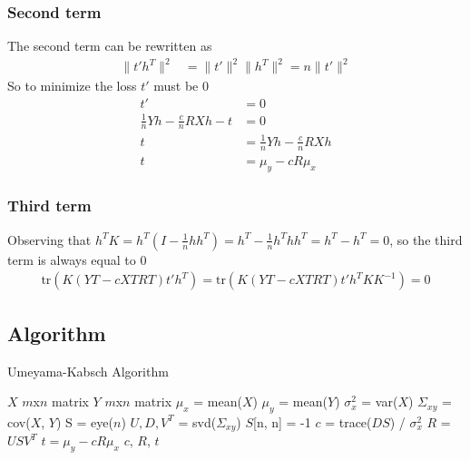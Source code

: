 \documentclass{report}
\begin{document}
\subsubsection{Second term}
The second term can be rewritten as
\begin{align}
    \lVert t'h^T \rVert^2 &= \lVert t'\rVert^2 \lVert h^T \rVert^2 = n \lVert t'\rVert^2
\end{align}
So to minimize the loss $t'$ must be 0
\begin{align}
    t' &= 0 \\
    \frac{1}{n}Yh - \frac{c}{n}RXh - t &= 0 \\
    t &= \frac{1}{n}Yh - \frac{c}{n}RXh \\
    t &= \mu_y - cR\mu_x 
\end{align}

\subsubsection{Third term}
Observing that $h^TK=h^T(I - \frac{1}{n}hh^T)=h^T-\frac{1}{n}h^Thh^T=h^T-h^T=0$, so the third term is always equal to 0
\begin{align}
    \text{tr}(K(YT-cXTRT)t'h^T) = \text{tr}(K(YT-cXTRT)t'h^TKK^{-1}) = 0
\end{align}

\newpage

\subsection{Algorithm}
\begin{algorithm}
    \caption{Umeyama-Kabsch Algorithm}
    \begin{algorithmic}
        \Require $X$ $m$x$n$ matrix
        \Require $Y$ $m$x$n$ matrix
        \State $\mu_x$ = mean($X$)
        \State $\mu_y$ = mean($Y$)
        \State $\sigma^2_x$ = var($X$)
        \State $\Sigma_{xy}$ = cov($X$, $Y$)
        \State S = eye($n$)
        \State $U, D, V^T$ = svd($\Sigma_{xy}$)
            \State  $S$[n, n] = -1
        \EndIf
        \State $c$ = trace($DS$) / $\sigma^2_x$
        \State $R$ = $U S V^T$
        \State $t = \mu_y - cR\mu_x$
        \State \Return $c$, $R$, $t$
    \end{algorithmic}
\end{algorithm}


\end{document}
